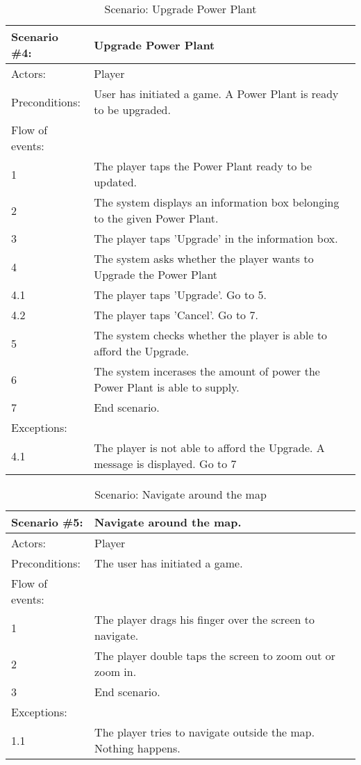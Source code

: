 \begin{table}
	\begin{tabular}{| l | p{10cm} |}
		\hline
		\rowcolor{lightgray}
		{\bf Scenario \#4:} & {\bf Upgrade Power Plant} \\ \hline
		Actors: & Player \\ \hline
		Preconditions: & User has initiated a game. A Power Plant is ready to be upgraded. \\ \hline
		\rowcolor{lightergray}
		Flow of events: & \\ \hline
		1 & The player taps the Power Plant ready to be updated. \\ \hline
		2 & The system displays an information box belonging to the given Power Plant. \\ \hline
		3 & The player taps 'Upgrade' in the information box. \\ \hline
		4 & The system asks whether the player wants to Upgrade the Power Plant \\ \hline
		4.1 & The player taps 'Upgrade'. Go to 5. \\ \hline
		4.2 & The player taps 'Cancel'. Go to 7. \\ \hline
		5 & The system checks whether the player is able to afford the Upgrade. \\ \hline
		6 & The system incerases the amount of power the Power Plant is able to supply. \\ \hline
		7 & End scenario. \\ \hline
		\rowcolor{lightergray}
		Exceptions: & \\ \hline
		4.1 & The player is not able to afford the Upgrade. A message is displayed. Go to 7 \\ \hline 
	\end{tabular}
\caption{Scenario: Upgrade Power Plant}
\end{table}

\begin{table}
	\begin{tabular}{| l | p{10cm} |}
		\hline
		\rowcolor{lightgray}
		{\bf Scenario \#5:} & {\bf Navigate around the map.} \\ \hline
		Actors: & Player \\ \hline
		Preconditions: & The user has initiated a game. \\ \hline
		\rowcolor{lightergray}
		Flow of events: & \\ \hline
		1 & The player drags his finger over the screen to navigate. \\ \hline
		2 & The player double taps the screen to zoom out or zoom in. \\ \hline
		3 & End scenario. \\ \hline
		\rowcolor{lightergray}
		Exceptions: & \\ \hline
		1.1 & The player tries to navigate outside the map. Nothing happens. \\ \hline
	\end{tabular}
	\caption{Scenario: Navigate around the map}
\end{table}

